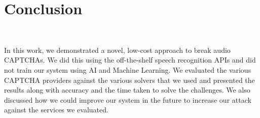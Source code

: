 \section{Conclusion}\mbox {} \
\label{sec:conclusions}

In this work, we demonstrated a novel, low-cost approach to break audio CAPTCHAs. We did this using the off-the-shelf speech recognition APIs and did not train our system using AI and Machine Learning. We evaluated the various CAPTCHA providers against the various solvers that we used and presented the results along with accuracy and the time taken to solve the challenges. We also discussed how we could improve our system in the future to increase our attack against the services we evaluated. 
